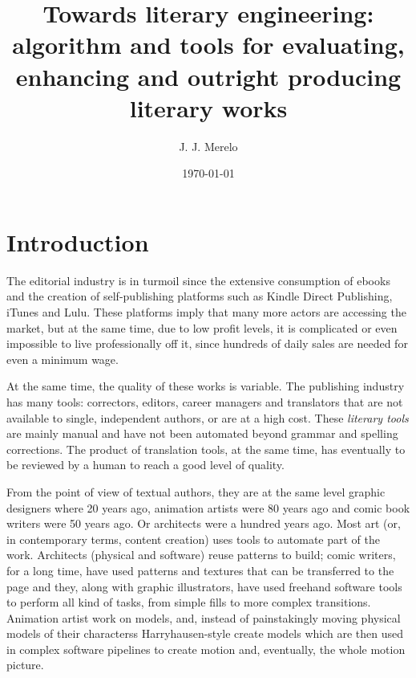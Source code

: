 \documentclass[a4paper,12pt,twocolumn]{article}
\title{Towards literary engineering: algorithm and tools for
  evaluating, enhancing and outright producing literary works}
\author{J. J. Merelo}
\date{\today}
\begin{document}
\section{Introduction}

The editorial industry is in turmoil since the extensive consumption
of ebooks and the creation of self-publishing platforms such as Kindle
Direct Publishing, iTunes and Lulu. These platforms imply that many more actors are accessing the market, but at the same time, due to low profit levels, it is complicated or even impossible to live professionally off it, since hundreds of daily sales are needed for even a minimum wage.

At the same time, the quality of these works is variable. The
publishing industry has many tools: correctors, editors, career
managers and translators that are not available to single, independent
authors, or are at a high cost. These {\em literary tools} are mainly manual and have not been
automated beyond grammar and spelling corrections. The product of translation tools,
at the same time, has eventually to be reviewed by a human to reach a
good level of quality.

From the point of view of textual authors, they are at the same level
graphic designers where 20 years ago, animation artists were 80 years ago and comic book writers were 50
years ago. Or architects were a hundred years ago. Most art (or, in
contemporary terms, content creation) uses tools to automate part of
the work. Architects (physical and software) reuse patterns to build;
comic writers, for a long time, have used patterns and textures that
can be transferred to the page and they, along with graphic
illustrators, have used freehand software tools to perform all kind of
tasks, from simple fills to more complex transitions. Animation artist
work on models, and, instead of painstakingly moving physical models
of their characterss  Harryhausen-style create models which are then
used in complex software pipelines to create motion and, eventually,
the whole motion picture.
\end{document}
